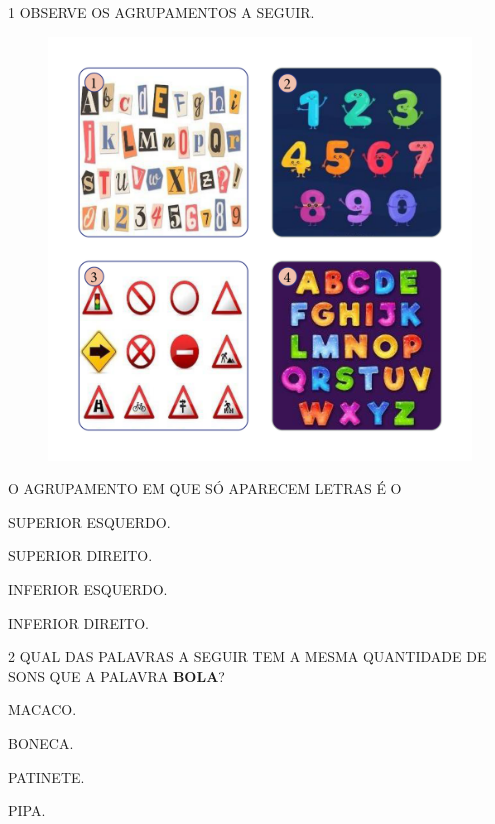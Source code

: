 
\num{1} OBSERVE OS AGRUPAMENTOS A SEGUIR.

\begin{figure}[H]
\includegraphics[width=.9\textwidth]{media/image183a186}
\end{figure}

O AGRUPAMENTO EM QUE SÓ APARECEM LETRAS É O

\begin{multicols}{2}
\begin{escolha}
\item SUPERIOR ESQUERDO.

\item SUPERIOR DIREITO.

\item INFERIOR ESQUERDO.

\item INFERIOR DIREITO.
\end{escolha}
\end{multicols}

\num{2} QUAL DAS PALAVRAS A SEGUIR TEM A MESMA QUANTIDADE DE SONS QUE A PALAVRA \textbf{BOLA}?

\begin{escolha}[itemsep=-5pt]
\item MACACO.

\item BONECA.

\item PATINETE.

\item PIPA.
\end{escolha}

